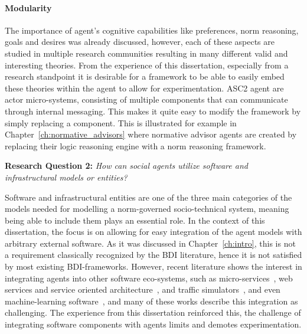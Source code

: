  
\paragraph{Modularity} The importance of agent's cognitive capabilities like preferences, norm reasoning, goals and desires was already discussed, however, each of these aspects are studied in multiple research communities resulting in many different valid and interesting theories. From the experience of this dissertation, especially from a research standpoint it is desirable for a framework to be able to easily embed these theories within the agent to allow for experimentation. ASC2 agent are actor micro-systems, consisting of multiple components that can communicate through internal messaging. This makes it quite easy to modify the framework by simply replacing a component. This is illustrated for example in Chapter~\ref{ch:normative_advisors} where normative advisor agents are created by replacing their logic reasoning engine with a norm reasoning framework.



\begin{displayquote}
\textbf{Research Question 2:} \textit{How can social agents utilize software and infrastructural models or entities?}
\end{displayquote}

Software and infrastructural entities are one of the three main categories of the models needed for modelling a norm-governed socio-technical system, meaning being able to include them plays an essential role. In the context of this dissertation, the focus is on allowing for easy integration of the agent models with arbitrary external software. As it was discussed in Chapter~\ref{ch:intro}, this is not a requirement classically recognized by the BDI literature, hence it is not satisfied by most existing BDI-frameworks. However, recent literature shows the interest in integrating agents into other software eco-systems, such as micro-services~\cite{Collier2019}, web services and service oriented architecture~\cite{Rafalimanana@2020}, and traffic simulators~\cite{baumfalk2019sumo}, and even machine-learning software~\cite{lutzenberger2011bdi}, and many of these works describe this integration as challenging. The experience from this dissertation reinforced this, the challenge of integrating software components with agents limits and demotes experimentation.

